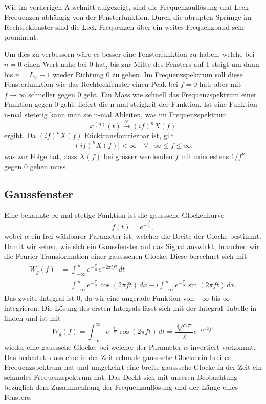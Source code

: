 Wie im vorherigen Abschnitt aufgezeigt, sind die Frequenzauflösung und 
Leck-Frequenzen abhängig von der Fensterfunktion.
Durch die abrupten Sprünge im Rechteckfenster sind die Leck-Frequenzen 
über ein weites Frequenzband sehr prominent.

Um dies zu verbessern wäre es besser eine Fensterfunktion zu haben,
welche bei $n = 0$ einen Wert nahe bei 0 hat,
bis zur Mitte des Fensters auf 1 steigt um dann bis $n = L_w -1$ wieder Richtung 0 zu gehen. 
Im Frequenzspektrum soll diese Fensterfunktion wie das Rechteckfenster einen 
Peak bei $f = 0$ hat, aber mit $f \rightarrow \infty$ schneller
gegen 0 geht.
Ein Mass wie schnell das Frequenzspektrum einer Funktion gegen 0 geht, liefert
die n-mal steigkeit der Funktion.
Ist eine Funktion n-mal stetetig kann man sie n-mal Ableiten, was im Frequenzspektrum
\begin{equation}
    x^{(n)}(t) \xrightarrow{\mathscr{F}} (i f)^n X(f)
\end{equation}
ergibt.
Da $(i f)^n X(f)$ Rücktransfomrierbar ist, gilt
\begin{equation}
    |(i f)^n X(f)| < \infty \quad \forall -\infty \leq f \leq \infty,
\end{equation}
was zur Folge hat, dass $X(f)$ bei grösser werdenden $f$ mit mindestens $1/f^n$ gegen 
0 gehen muss.

\subsection{Gaussfenster}
Eine bekannte $\infty$-mal stetige Funktion ist die gausssche Glockenkurve
\begin{equation}
    f(t) = e^{-\frac{t^2}{\alpha}},
\end{equation}
wobei $\alpha$ ein frei wählbarer Parameter ist, welcher die Breite der Glocke 
bestimmt.
Damit wir sehen, wie sich ein Gaussfenster auf das Signal auswirkt, brauchen wir
die Fourier-Transformation einer gaussschen Glocke.
Diese berechnet sich mit 
\begin{align}
    W_g(f) &= \int_{-\infty}^{\infty} e^{-\frac{t^2}{\alpha}} e^{- 2 \pi i f t}\, dt\\
    &= \int_{-\infty}^{\infty} e^{-\frac{t^2}{\alpha}} \cos(2 \pi f t)\, dx -
    i \int_{-\infty}^{\infty} e^{-\frac{t^2}{\alpha}} \sin(2 \pi f t)\, dx .
\end{align}
Das zweite Integral ist 0, da wir eine ungerade Funktion von $-\infty$ bis $\infty$ integrieren.
Die Lösung des ersten Integrals lässt sich mit der Integral Tabelle in \cite{sonogramm:bronstein} finden und ist mit
\begin{equation}
    W_g(f) = \int_{-\infty}^{\infty} e^{-\frac{t^2}{\alpha}} \cos(2 \pi f t)\, dt =
    \frac{\sqrt[2]{\alpha \pi}}{2} e^{-\alpha \pi^2 f^2}
\end{equation}
wieder eine gausssche Glocke, bei welcher der Parameter $\alpha$ invertiert vorkommt.
Das bedeutet, dass eine in der Zeit schmale gausssche Glocke ein breites Frequenzspektrum hat und umgekehrt eine
breite gausssche Glocke in der Zeit ein schmales Frequenzspektrum hat.
Das Deckt sich mit unseren Beobachtung bezüglich dem Zusammenhang der 
Frequenzauflösung und der Länge eines Fensters.

